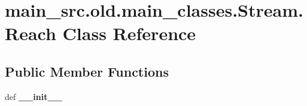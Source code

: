 \hypertarget{classmain__src_8old_1_1main__classes_1_1Stream_1_1Reach}{\section{main\-\_\-src.\-old.\-main\-\_\-classes.\-Stream.\-Reach Class Reference}
\label{classmain__src_8old_1_1main__classes_1_1Stream_1_1Reach}
}
\subsection*{Public Member Functions}
\begin{DoxyCompactItemize}
\item 
\hypertarget{classmain__src_8old_1_1main__classes_1_1Stream_1_1Reach_aa22d35b4fa585858f73b8db995595236}{def {\bfseries \-\_\-\-\_\-init\-\_\-\-\_\-}}\label{classmain__src_8old_1_1main__classes_1_1Stream_1_1Reach_aa22d35b4fa585858f73b8db995595236}

\end{DoxyCompactItemize}
